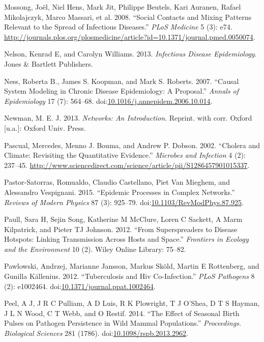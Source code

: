 \documentclass[]{book}
\theoremstyle{definition}
\theoremstyle{definition}
\theoremstyle{definition}
\theoremstyle{remark}
\begin{document}
\hypertarget{ref-mossong08}{}
Mossong, Joël, Niel Hens, Mark Jit, Philippe Beutels, Kari Auranen,
Rafael Mikolajczyk, Marco Massari, et al. 2008. ``Social Contacts and
Mixing Patterns Relevant to the Spread of Infectious Diseases.''
\emph{PLoS Medicine} 5 (3): e74.
\url{http://journals.plos.org/plosmedicine/article?id=10.1371/journal.pmed.0050074}.

\hypertarget{ref-nelson13}{}
Nelson, Kenrad E, and Carolyn Williams. 2013. \emph{Infectious Disease
Epidemiology}. Jones \& Bartlett Publishers.

\hypertarget{ref-ness07}{}
Ness, Roberta B., James S. Koopman, and Mark S. Roberts. 2007. ``Causal
System Modeling in Chronic Disease Epidemiology: A Proposal.''
\emph{Annals of Epidemiology} 17 (7): 564--68.
doi:\href{https://doi.org/10.1016/j.annepidem.2006.10.014}{10.1016/j.annepidem.2006.10.014}.

\hypertarget{ref-newman13}{}
Newman, M. E. J. 2013. \emph{Networks: An Introduction}. Reprint. with
corr. Oxford {[}u.a.{]}: Oxford Univ. Press.

\hypertarget{ref-pascual02}{}
Pascual, Mercedes, Menno J. Bouma, and Andrew P. Dobson. 2002. ``Cholera
and Climate: Revisiting the Quantitative Evidence.'' \emph{Microbes and
Infection} 4 (2): 237--45.
\url{http://www.sciencedirect.com/science/article/pii/S1286457901015337}.

\hypertarget{ref-pastor-satorras15}{}
Pastor-Satorras, Romualdo, Claudio Castellano, Piet Van Mieghem, and
Alessandro Vespignani. 2015. ``Epidemic Processes in Complex Networks.''
\emph{Reviews of Modern Physics} 87 (3): 925--79.
doi:\href{https://doi.org/10.1103/RevModPhys.87.925}{10.1103/RevModPhys.87.925}.

\hypertarget{ref-paull12}{}
Paull, Sara H, Sejin Song, Katherine M McClure, Loren C Sackett, A Marm
Kilpatrick, and Pieter TJ Johnson. 2012. ``From Superspreaders to
Disease Hotspots: Linking Transmission Across Hosts and Space.''
\emph{Frontiers in Ecology and the Environment} 10 (2). Wiley Online
Library: 75--82.

\hypertarget{ref-pawlowski12}{}
Pawlowski, Andrzej, Marianne Jansson, Markus Sköld, Martin E Rottenberg,
and Gunilla Källenius. 2012. ``Tuberculosis and Hiv Co-Infection.''
\emph{PLoS Pathogens} 8 (2): e1002464.
doi:\href{https://doi.org/10.1371/journal.ppat.1002464}{10.1371/journal.ppat.1002464}.

\hypertarget{ref-peel14}{}
Peel, A J, J R C Pulliam, A D Luis, R K Plowright, T J O'Shea, D T S
Hayman, J L N Wood, C T Webb, and O Restif. 2014. ``The Effect of
Seasonal Birth Pulses on Pathogen Persistence in Wild Mammal
Populations.'' \emph{Proceedings. Biological Sciences} 281 (1786).
doi:\href{https://doi.org/10.1098/rspb.2013.2962}{10.1098/rspb.2013.2962}.
\end{document}
